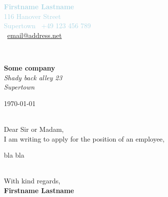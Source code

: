 \documentclass[11pt]{article}
\begin{document}
\sffamily   %
\hfill%
\begin{minipage}[t]{.6\textwidth}
\raggedleft%
\small%
\textcolor{lightblue}{
{\bfseries Firstname Lastname}\\[.35ex]
116 Hanover Street\\
Supertown
\Telefon~+49 123 456 789\\
\Letter~\href{mailto:email@address.net}{email@address.net}%
}
\end{minipage}\\[1em]
%
\begin{minipage}[t]{.4\textwidth}
\raggedright%
{\bfseries Some company}\\[.35ex]
\small\itshape%
Shady back alley 23\\
Supertown
\end{minipage}
\hfill %
\begin{minipage}[t]{.4\textwidth}
\raggedleft %
\today
\end{minipage}\\[2em]

Dear Sir or Madam,\\[1em]

I am writing to apply for the position of an employee, 

bla bla

\\[3em]
With kind regards,\\[1.2em]
{\bfseries Firstname Lastname}
\end{document}
